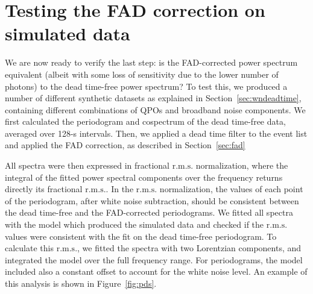 \documentclass[twocolumn]{aastex61}
\newcommand{\project}[1]{\textsl{#1}}
\newcommand{\nustar}{\project{NuSTAR}\xspace}
\newcommand{\rms}{\ensuremath{\mathrm{r.m.s.}}\xspace}
\begin{document}
\section{Testing the FAD correction on simulated data} \label{sec:correction}

\begin{figure*}
    \caption{Periodograms and cospectra from a simulation with four Lorentzian features (at 50, 200, 300 and 400 Hz) with 40-Hz full with at half maximum (FWHM). 
    We plotted and fitted periodograms and cospectra before and after applying the dead time filter
    The total \rms before dead time was 40\% and the incident photon flux 400 ct/s. 
    After applying a dead time of 2.5 ms like in \nustar, the ``detected'' photon flux decreased to $\sim$200 ct/s as expected. 
    As can be seen from the best-fit curves, there is no significant difference between FAD-normalized and deadtime-free periodograms and cospectra.
    For comparison, we also plot the cospectrum without FAD (pink), showing very different amplitudes for the four Lorentzians, due to dead time.
    }
    \label{fig:pds}
\end{figure*}

We are now ready to verify the last step: is the FAD-corrected power spectrum equivalent (albeit with some loss of sensitivity due to the lower number of photons) to the dead time-free power spectrum?
To test this, we produced a number of different synthetic datasets as explained in Section~\ref{sec:wndeadtime}, containing different combinations of QPOs and broadband noise components. 
We first calculated the periodogram and cospectrum of the dead time-free data, averaged over 128-s intervals.
Then, we applied a dead time filter to the event list and applied the FAD correction, as described in Section~\ref{sec:fad}

All spectra were then expressed in fractional \rms \citep{BelloniHasinger90,Miyamoto+91} normalization, where the integral of the fitted power spectral components over the frequency returns directly its fractional \rms.
In the \rms normalization, the values of each point of the periodogram, after white noise subtraction, should be consistent between the dead time-free and the FAD-corrected periodograms.
We fitted all spectra with the model which produced the simulated data and checked if the \rms values were consistent with the fit on the dead time-free periodogram.
To calculate this \rms, we fitted the spectra with two Lorentzian components, and integrated the model over the full frequency range.
For periodograms, the model included also a constant offset to account for the white noise level.
An example of this analysis is shown in Figure~\ref{fig:pds}.
\end{document}
